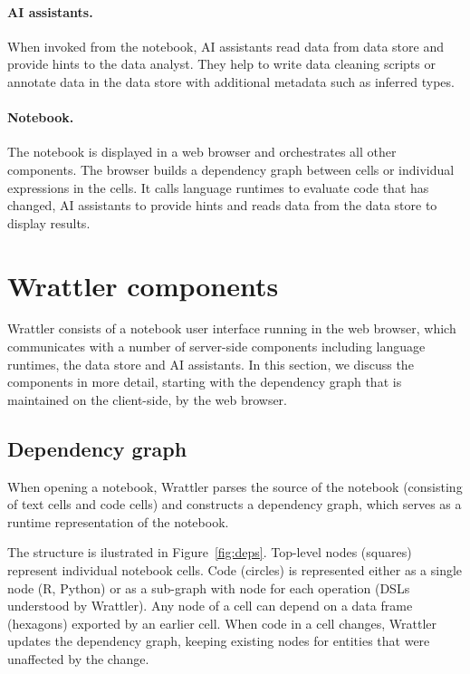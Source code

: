 \documentclass[sigplan,preprint,10pt]{acmart}\settopmatter{printfolios=true,printccs=false,printacmref=false}
\theoremstyle{plain}
\theoremstyle{definition}
\begin{document}
\paragraph{AI assistants.} When invoked from the notebook, AI assistants read data
from data store and provide hints to the data analyst. They help to write data cleaning
scripts or annotate data in the data store with additional metadata such as inferred types.

\paragraph{Notebook.} The notebook is displayed in a web browser and orchestrates 
all other components. The browser builds a dependency graph between cells or individual 
expressions in the cells. It calls language runtimes to evaluate code that has changed,
AI assistants to provide hints and reads data from the data store to display results.  

\section{Wrattler components}
\label{sec:wrattler}

Wrattler consists of a notebook user interface running in the web browser, which communicates with 
a number of server-side components including language runtimes, the data store and AI assistants. 
In this section, we discuss the components in more detail, starting with the dependency graph
that is maintained on the client-side, by the web browser.

\subsection{Dependency graph}

When opening a notebook, Wrattler parses the source of the notebook (consisting of text cells and 
code cells) and constructs a dependency graph, which serves as a runtime representation of the
notebook. 

The structure is ilustrated in Figure~\ref{fig:deps}. Top-level nodes (squares) represent
individual notebook cells. Code (circles) is represented either as a single node (R, Python) or as 
a sub-graph with node for each operation (DSLs understood by Wrattler). Any node of a cell can 
depend on a data frame (hexagons) exported by an earlier cell. 
When code in a cell changes, Wrattler updates the dependency graph, keeping existing
nodes for entities that were unaffected by the change. 
\end{document}
